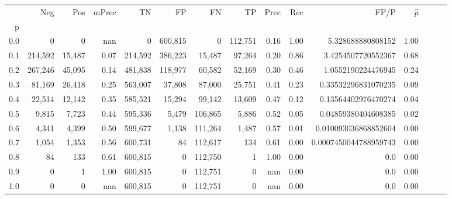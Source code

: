 \begin{tabular}{rrrrrrrrrrrrrrr}
\toprule
{} &      Neg &     Pos & mPrec &       TN &       FP &       FN &       TP &  Prec &   Rec &                   FP/P & $\hat{p}$ \\
p   &          &         &       &          &          &          &          &       &       &                        &           \\
\midrule
0.0 &        0 &       0 &   nan &        0 &  600,815 &        0 &  112,751 &  0.16 &  1.00 &      5.328688880808152 &      1.00 \\
0.1 &  214,592 &  15,487 &  0.07 &  214,592 &  386,223 &   15,487 &   97,264 &  0.20 &  0.86 &     3.4254507720552367 &      0.68 \\
0.2 &  267,246 &  45,095 &  0.14 &  481,838 &  118,977 &   60,582 &   52,169 &  0.30 &  0.46 &     1.0552190224476945 &      0.24 \\
0.3 &   81,169 &  26,418 &  0.25 &  563,007 &   37,808 &   87,000 &   25,751 &  0.41 &  0.23 &    0.33532296831070235 &      0.09 \\
0.4 &   22,514 &  12,142 &  0.35 &  585,521 &   15,294 &   99,142 &   13,609 &  0.47 &  0.12 &    0.13564402976470274 &      0.04 \\
0.5 &    9,815 &   7,723 &  0.44 &  595,336 &    5,479 &  106,865 &    5,886 &  0.52 &  0.05 &    0.04859380404608385 &      0.02 \\
0.6 &    4,341 &   4,399 &  0.50 &  599,677 &    1,138 &  111,264 &    1,487 &  0.57 &  0.01 &   0.010093036868852604 &      0.00 \\
0.7 &    1,054 &   1,353 &  0.56 &  600,731 &       84 &  112,617 &      134 &  0.61 &  0.00 &  0.0007450044788959743 &      0.00 \\
0.8 &       84 &     133 &  0.61 &  600,815 &        0 &  112,750 &        1 &  1.00 &  0.00 &                    0.0 &      0.00 \\
0.9 &        0 &       1 &  1.00 &  600,815 &        0 &  112,751 &        0 &   nan &  0.00 &                    0.0 &      0.00 \\
1.0 &        0 &       0 &   nan &  600,815 &        0 &  112,751 &        0 &   nan &  0.00 &                    0.0 &      0.00 \\
\bottomrule
\end{tabular}
